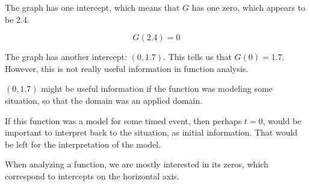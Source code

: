 \documentclass{ximera}
\begin{document}
The graph has one intercept, which means that $G$ has one zero, which appears to be $2.4$. 

\[  G(2.4) = 0  \]




The graph has another intercept: $(0, 1.7)$. This tells us that $G(0)=1.7$.  However, this is not really useful information in function analysis. 

$(0, 1.7)$ might be useful information if the function was modeling some situation, so that the domain was an applied domain.



If this function was a model for some timed event, then perhaps $t = 0$, would be important to interpret back to the situation, as initial information.  That would be left for the interpretation of the model. 


When analyzing a function, we are mostly interested in its zeros, which correspond to intercepts on the horizontal axis.
\end{document}
